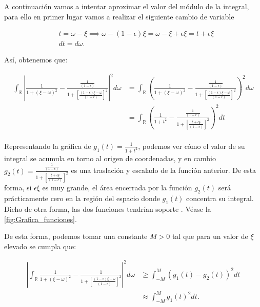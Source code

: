   \noindent A continuación vamos a intentar aproximar el valor del módulo de la integral, para ello en primer lugar vamos a realizar el siguiente cambio de variable 

  \begin{align*}
    &t=\omega-\xi \implies \omega-(1-\epsilon)\xi= \omega-\xi + \epsilon\xi = t +\epsilon\xi \\
    &dt=d\omega.
  \end{align*}

  \noindent Así, obtenemos que: 

  \begin{align*}
    \int_{\mathbb{R}} \left| \frac{1}{1+(\xi - \omega)^2} - \frac{\frac{1}{(1-\epsilon)}}{1+\left[ \frac{(1-\epsilon) \xi - \omega}{(1-\epsilon)}\right]^2} \right|^2 d\omega &=
    \int_{\mathbb{R}} \left(  \frac{1}{1+(\xi - \omega)^2} - \frac{\frac{1}{(1-\epsilon)}}{1+\left[ \frac{(1-\epsilon) \xi - \omega}{(1-\epsilon)}\right]^2}  \right)^2 d\omega \\
    &=\int_{\mathbb{R}} \left(  \frac{1}{1+t^2} - \frac{\frac{1}{(1-\epsilon)}}{1+\left[ \frac{t+\epsilon\xi}{(1-\epsilon)}\right]^2}  \right)^2 dt \\
  \end{align*}

  \noindent Representando la gráfica de $g_1(t)= \frac{1}{1+t^2}$, podemos ver cómo el valor de su integral se acumula en torno al origen de coordenadas, y en cambio $g_2(t)=\frac{\frac{1}{(1-\epsilon)}}{1+\left[ \frac{t+\epsilon\xi}{(1-\epsilon)}\right]^2}$ es una traslación y escalado de la función anterior. De esta forma, si $\epsilon\xi$ es muy grande, el área encerrada por la función $g_2(t)$ será prácticamente cero en la región del espacio donde $g_1(t)$ concentra su integral. Dicho de otra forma, las dos funciones tendrían soporte . Véase la \autoref{fig:Grafica_funciones}.

  \noindent De esta forma, podemos tomar una constante $M>0$ tal que para un valor de $\xi$ elevado se cumpla que: 

  \begin{align*}
    \left| \int_{\mathbb{R}}\frac{1}{1+(\xi - \omega)^2} - \frac{1}{1+\left[ \frac{(1-\epsilon) \xi - \omega}{(1-\epsilon)}\right]^2} \right|^2 d\omega 
    &\geq \int_{-M}^{M} (g_1(t)-g_2(t))^2 dt \\
    &\approx \int_{-M}^{M} g_1(t)^2 dt. \\
  \end{align*}

